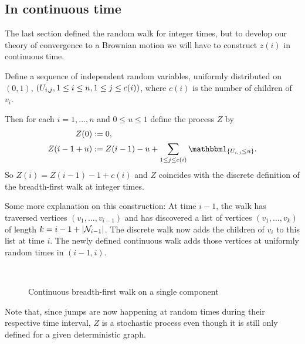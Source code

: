 \subsection{In continuous time}

The last section defined the random walk for integer times,
but to develop our theory of convergence to a Brownian motion
we will have to construct $z(i)$ in continuous time.

Define a sequence of independent random variables, 
uniformly distributed on $(0,1)$, 
$(U_{i,j}, 1 \leq i \leq n, 1 \leq j \leq c(i))$,
where $c(i)$ is the number of children of $v_i$.

Then for each $i = 1, \dots, n$ and $0 \leq u \leq 1$ define the process $Z$ by
\begin{equation} \label{E: def Z}
\begin{aligned}
Z(0) &:= 0, \\
Z(i - 1 + u) &:= Z(i-1) - u + \sum_{1 \leq j \leq c(i)} \Ind{\{ \Uij \leq u \}}.
\end{aligned}
\end{equation}
So $Z(i) = Z(i-1) - 1 + c(i)$ and $Z$ coincides with the discrete definition of the breadth-first walk at integer times.

Some more explanation on this construction:
At time $i-1$, 
the walk has traversed vertices
$(v_1, \dots, v_{i-1})$
and has discovered a list of vertices
$(v_1, \dots, v_k)$
of length
$k = i-1 + |\mathcal{N}_{i-1}|$.
The discrete walk now adds the children of $v_i$ to this list at time $i$.
The newly defined continuous walk adds those vertices at uniformly random times in $(i-1, i)$.

\begin{figure}[H]
	\centering
	\\
	
	\centering
	
	\caption{Continuous breadth-first walk on a single component}
	\label{F: bf-walk cont}
\end{figure} 

Note that, 
since jumps are now happening at random times during their respective time interval, 
$Z$ is a stochastic process even though it is still only defined for a given deterministic graph.


